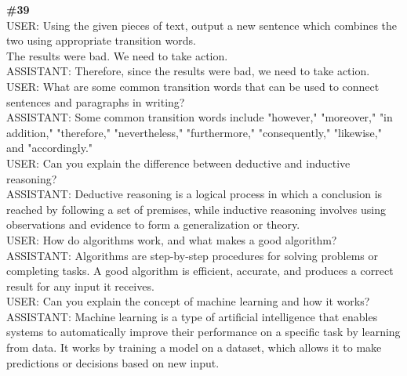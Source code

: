 \documentclass[10pt]{article}
\begin{document}
\begin{Form}
\vspace{8pt}
\begin{tcolorbox}[colback=convbg,colframe=itemframe,boxrule=0.8pt,arc=2pt,breakable,left=6pt,right=6pt,top=5pt,bottom=5pt]
{\footnotesize\textbf{\#39}}\\[3pt]
{\footnotesize USER: Using the given pieces of text, output a new sentence which combines the two using appropriate transition words. \\[2pt]
The results were bad. We need to take action. \\[2pt]
ASSISTANT: Therefore, since the results were bad, we need to take action.   \\[2pt]
USER: What are some common transition words that can be used to connect sentences and paragraphs in writing? \\[2pt]
ASSISTANT: Some common transition words include "however," "moreover," "in addition," "therefore," "nevertheless," "furthermore," "consequently," "likewise," and "accordingly."   \\[2pt]
USER: Can you explain the difference between deductive and inductive reasoning? \\[2pt]
ASSISTANT: Deductive reasoning is a logical process in which a conclusion is reached by following a set of premises, while inductive reasoning involves using observations and evidence to form a generalization or theory.   \\[2pt]
USER: How do algorithms work, and what makes a good algorithm? \\[2pt]
ASSISTANT: Algorithms are step-by-step procedures for solving problems or completing tasks. A good algorithm is efficient, accurate, and produces a correct result for any input it receives.   \\[2pt]
USER: Can you explain the concept of machine learning and how it works? \\[2pt]
ASSISTANT: Machine learning is a type of artificial intelligence that enables systems to automatically improve their performance on a specific task by learning from data. It works by training a model on a dataset, which allows it to make predictions or decisions based on new input.  }
\end{tcolorbox}
\vspace{-1pt}
\CheckBox[name=q39c,width=1.6ex,height=1.6ex,bordercolor={0.45 0.45 0.45}]{~\textcolor{cbox}{COMPACT}}\quad
\CheckBox[name=q39d,width=1.6ex,height=1.6ex,bordercolor={0.45 0.45 0.45}]{~\textcolor{dbox}{DIFFUSE}}\quad
\CheckBox[name=q39n,width=1.6ex,height=1.6ex,bordercolor={0.45 0.45 0.45}]{~\textcolor{nbox}{NONE}}

\end{Form}
\end{document}
